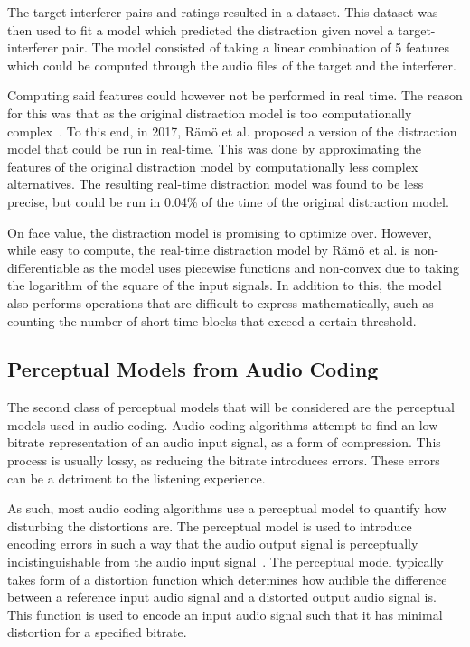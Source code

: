 The target-interferer pairs and ratings resulted in a dataset.
This dataset was then used to fit a model which predicted the distraction given novel a target-interferer pair.
The model consisted of taking a linear combination of 5 features which could be computed through the audio files of the 
target and the interferer.

Computing said features could however not be performed in real time.
The reason for this was that as the original distraction model is too computationally complex~\cite{ramo2017real}.
To this end, in 2017, R\"am\"o et al. proposed a version of the distraction model that could be run in real-time.
This was done by approximating the features of the original distraction model by computationally less complex alternatives.
The resulting real-time distraction model was found to be less precise, but could be run in 0.04\% of the time of the 
original distraction model.

On face value, the distraction model is promising to optimize over.
However, while easy to compute, the real-time distraction model by R\"am\"o et al. is non-differentiable as the model uses
piecewise functions and non-convex due to taking the logarithm of the square of the input signals.
In addition to this, the model also performs operations that are difficult to express mathematically, such as counting 
the number of short-time blocks that exceed a certain threshold.

\subsection{Perceptual Models from Audio Coding }
\label{ch:perceptual:review:audio_coding}
The second class of perceptual models that will be considered are the perceptual models used in audio coding.
Audio coding algorithms attempt to find an low-bitrate representation of an audio input signal, as a form of compression.
This process is usually lossy, as reducing the bitrate introduces errors.
These errors can be a detriment to the listening experience.

As such, most audio coding algorithms use a perceptual model to quantify how disturbing the distortions are.
The perceptual model is used to introduce encoding errors in such a way that the audio output
signal is perceptually indistinguishable from the audio input signal~\cite{taal2012low}.
The perceptual model typically takes form of a distortion function which determines how
audible the difference between a reference input audio signal and a distorted output audio signal is.
This function is used to encode an input audio signal such that it has minimal distortion for a
specified bitrate.

